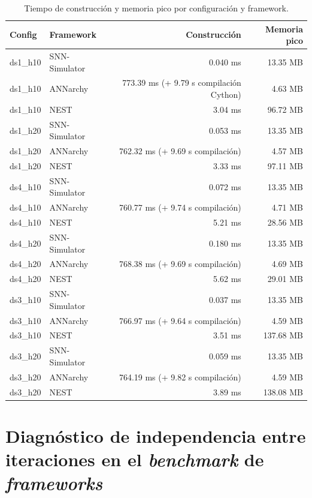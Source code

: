 \begin{table}[htbp]
\centering
\small
\caption{Tiempo de construcción y memoria pico por configuración y framework.}
\label{tab:framework-build-memory-res}
\begin{tabular}{llrr}
\toprule
Config & Framework & Construcción & Memoria pico \\
\midrule
ds1\_h10 & SNN-Simulator & 0.040 ms & 13.35 MB \\
ds1\_h10 & ANNarchy      & 773.39 ms (+ 9.79 s compilación Cython) & 4.63 MB \\
ds1\_h10 & NEST          & 3.04 ms  & 96.72 MB \\
ds1\_h20 & SNN-Simulator & 0.053 ms & 13.35 MB \\
ds1\_h20 & ANNarchy      & 762.32 ms (+ 9.69 s compilación) & 4.57 MB \\
ds1\_h20 & NEST          & 3.33 ms  & 97.11 MB \\
ds4\_h10 & SNN-Simulator & 0.072 ms & 13.35 MB \\
ds4\_h10 & ANNarchy      & 760.77 ms (+ 9.74 s compilación) & 4.71 MB \\
ds4\_h10 & NEST          & 5.21 ms  & 28.56 MB \\
ds4\_h20 & SNN-Simulator & 0.180 ms & 13.35 MB \\
ds4\_h20 & ANNarchy      & 768.38 ms (+ 9.69 s compilación) & 4.69 MB \\
ds4\_h20 & NEST          & 5.62 ms  & 29.01 MB \\
ds3\_h10 & SNN-Simulator & 0.037 ms & 13.35 MB \\
ds3\_h10 & ANNarchy      & 766.97 ms (+ 9.64 s compilación) & 4.59 MB \\
ds3\_h10 & NEST          & 3.51 ms  & 137.68 MB \\
ds3\_h20 & SNN-Simulator & 0.059 ms & 13.35 MB \\
ds3\_h20 & ANNarchy      & 764.19 ms (+ 9.82 s compilación) & 4.59 MB \\
ds3\_h20 & NEST          & 3.89 ms  & 138.08 MB \\
\bottomrule
\end{tabular}
\end{table}

\section{Diagnóstico de independencia entre iteraciones en el \textit{benchmark} de \textit{frameworks}}
\label{sec:anexo-independencia}

